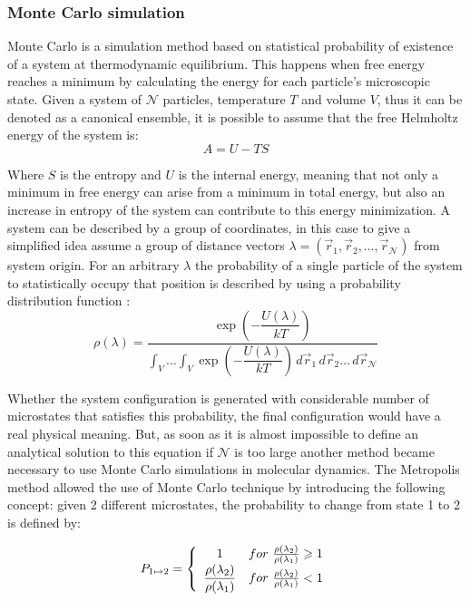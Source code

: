 \documentclass[10pt,a4paper,twoside]{article}
\begin{document}
\subsubsection{Monte Carlo simulation}
Monte Carlo is  a simulation method based on statistical probability of existence of a system at thermodynamic equilibrium. This happens when free energy reaches a minimum by calculating the energy for each particle's microscopic state. Given a system of $ \mathcal{N}$ particles, temperature $T$ and volume $V$, thus it can be denoted as a canonical ensemble, it is possible to assume that  the free Helmholtz energy of the system is:
\begin{equation}
A = U - TS
\label{eqn:freeE}
\end{equation}

Where $S$ is the entropy and $U$ is the internal energy, meaning that not only a minimum in free energy can arise from a minimum in total energy, but also an increase in entropy of the system can contribute to this energy minimization. A system can be described by a group of coordinates, in this case to give a simplified idea assume a group of distance vectors $\lambda = (	\vec{r}_1,\vec{r}_2, \ldots, \vec{r}_\mathcal{N} )$ from system origin. For an arbitrary $\lambda$ the probability of a single particle of the system to statistically occupy that position is described by using a probability distribution function \cite{satoh}:
\begin{equation}
\rho(\lambda) = \dfrac{\exp{\left(-\dfrac{U(\lambda)}{kT}\right)}}{\displaystyle \int_V \dots   \int_V \exp{\left(-\dfrac{U(\lambda)}{kT}\right)}\,d\vec{r}_1 \,d\vec{r}_2 \ldots \,d\vec{r}_\mathcal{N} }
\label{eqn:rho}
\end{equation}

Whether the system configuration is generated with considerable number of microstates that satisfies this probability, the final configuration would have a real physical meaning. But, as soon as it is almost impossible to define an analytical solution to this equation if $\mathcal{N}$ is too large another method became necessary to use Monte Carlo simulations in molecular dynamics. The Metropolis method \cite{metropolis} allowed the use of Monte Carlo technique by introducing the following concept: given 2 different microstates, the probability to change from state 1 to 2 is defined by:

\begin{equation}
 P_{1\mapsto2} = \left\{
\begin{array}{c l}     
    1 & for \ \frac{\rho(\lambda_2)}{\rho(\lambda_1)}\geqslant1\\
    \dfrac{\rho(\lambda_2)}{\rho(\lambda_1)} & for \ \frac{\rho(\lambda_2)}{\rho(\lambda_1)}<1
\end{array}\right.
\label{eqn:metrop}
\end{equation}
\end{document}
